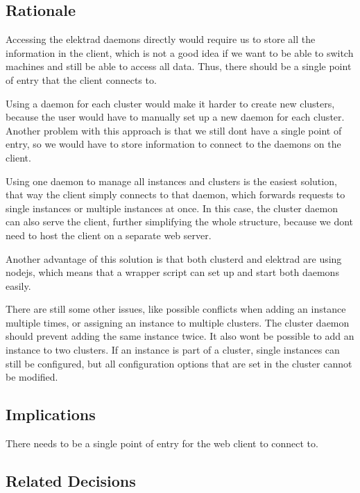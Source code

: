 \subsection*{Rationale}

Accessing the elektrad daemons directly would require us to store all the information in the client, which is not a good idea if we want to be able to switch machines and still be able to access all data. Thus, there should be a single point of entry that the client connects to.

Using a daemon for each cluster would make it harder to create new clusters, because the user would have to manually set up a new daemon for each cluster. Another problem with this approach is that we still don\textquotesingle{}t have a single point of entry, so we would have to store information to connect to the daemons on the client.

Using one daemon to manage all instances and clusters is the easiest solution, that way the client simply connects to that daemon, which forwards requests to single instances or multiple instances at once. In this case, the cluster daemon can also serve the client, further simplifying the whole structure, because we don\textquotesingle{}t need to host the client on a separate web server.

Another advantage of this solution is that both clusterd and elektrad are using nodejs, which means that a wrapper script can set up and start both daemons easily.

There are still some other issues, like possible conflicts when adding an instance multiple times, or assigning an instance to multiple clusters. The cluster daemon should prevent adding the same instance twice. It also won\textquotesingle{}t be possible to add an instance to two clusters. If an instance is part of a cluster, single instances can still be configured, but all configuration options that are set in the cluster cannot be modified.

\subsection*{Implications}


\begin{DoxyItemize}
\item There needs to be a single point of entry for the web client to connect to.
\end{DoxyItemize}

\subsection*{Related Decisions}


